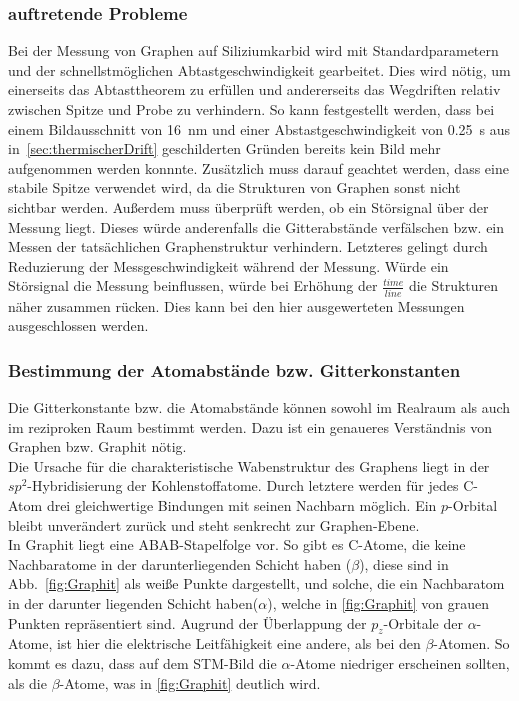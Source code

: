 \documentclass[a4paper,twoside,final]{article}
\begin{document}
\subsubsection{auftretende Probleme}
Bei der Messung von Graphen auf Siliziumkarbid wird mit Standardparametern und der schnellstmöglichen Abtastgeschwindigkeit gearbeitet. Dies wird nötig, um einerseits das Abtasttheorem zu erfüllen und andererseits das Wegdriften relativ zwischen Spitze und Probe zu verhindern. So kann festgestellt werden, dass bei einem Bildausschnitt von \SI{16}{\nano\meter} und einer Abstastgeschwindigkeit von \SI{0,25}{\second} aus in~\ref{sec:thermischerDrift} geschilderten Gründen bereits kein Bild mehr aufgenommen werden konnnte. Zusätzlich muss darauf geachtet werden, dass eine stabile Spitze verwendet wird, da die Strukturen von Graphen sonst nicht sichtbar werden. Außerdem muss überprüft werden, ob ein Störsignal über der Messung liegt. Dieses würde anderenfalls die Gitterabstände verfälschen bzw. ein Messen der tatsächlichen Graphenstruktur verhindern. Letzteres gelingt durch Reduzierung der Messgeschwindigkeit während der Messung. Würde ein Störsignal die Messung beinflussen, würde bei Erhöhung der $\frac{time}{line}$ die Strukturen näher zusammen rücken. Dies kann bei den hier ausgewerteten Messungen ausgeschlossen werden.

\subsubsection{Bestimmung der Atomabstände bzw. Gitterkonstanten}
Die Gitterkonstante bzw. die Atomabstände können sowohl im Realraum als auch im reziproken Raum bestimmt werden. Dazu ist ein genaueres Verständnis von Graphen bzw. Graphit nötig.\\
Die Ursache für die charakteristische Wabenstruktur des Graphens liegt in der $sp^2$-Hy\-bri\-di\-sie\-rung der Kohlenstoffatome. Durch letztere werden für jedes C-Atom drei gleichwertige Bindungen mit seinen Nachbarn möglich. Ein $p$-Orbital bleibt unverändert zurück und steht senkrecht zur Graphen-Ebene.\\
In Graphit liegt eine ABAB-Stapelfolge vor. So gibt es C-Atome, die keine Nachbaratome in der darunterliegenden Schicht haben ($\beta$), diese sind in Abb.~\ref{fig:Graphit} als weiße Punkte dargestellt, und solche, die ein Nachbaratom in der darunter liegenden Schicht haben($\alpha$), welche in \ref{fig:Graphit} von grauen Punkten repräsentiert sind. Augrund der Überlappung der $p_z$-Orbitale der $\alpha$-Atome, ist hier die elektrische Leitfähigkeit eine andere, als bei den $\beta$-Atomen. So kommt es dazu, dass auf dem STM-Bild die $\alpha$-Atome niedriger erscheinen sollten, als die $\beta$-Atome, was in \ref{fig:Graphit} deutlich wird.
\end{document}

